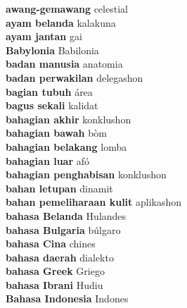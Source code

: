 \textbf{ awang-gemawang  } celestial \\
\textbf{ ayam belanda  } kalakuna \\
\textbf{ ayam jantan  } gai \\
\textbf{ Babylonia  } Babilonia \\
\textbf{ badan manusia  } anatomia \\
\textbf{ badan perwakilan  } delegashon \\
\textbf{ bagian tubuh  } área \\
\textbf{ bagus sekali  } kalidat \\
\textbf{ bahagian akhir  } konklushon \\
\textbf{ bahagian bawah  } bòm \\
\textbf{ bahagian belakang  } lomba \\
\textbf{ bahagian luar  } afó \\
\textbf{ bahagian penghabisan  } konklushon \\
\textbf{ bahan letupan  } dinamit \\
\textbf{ bahan pemeliharaan kulit  } aplikashon \\
\textbf{ bahasa Belanda  } Hulandes \\
\textbf{ bahasa Bulgaria  } búlgaro \\
\textbf{ bahasa Cina  } chines \\
\textbf{ bahasa daerah  } dialekto \\
\textbf{ bahasa Greek  } Griego \\
\textbf{ bahasa Ibrani  } Hudiu \\
\textbf{ Bahasa Indonesia  } Indones \\
